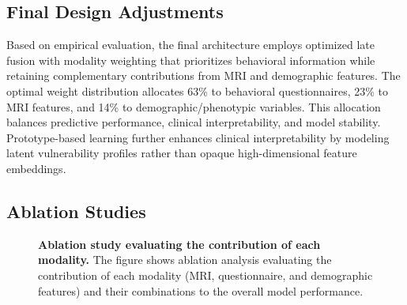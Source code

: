 \documentclass[10pt,letterpaper]{article}
\begin{document}
                                                                                                                          \subsection*{Final Design Adjustments}

                                                                                                                          Based on empirical evaluation, the final architecture employs optimized late fusion with modality weighting that prioritizes behavioral information while retaining complementary contributions from MRI and demographic features. The optimal weight distribution allocates 63\% to behavioral questionnaires, 23\% to MRI features, and 14\% to demographic/phenotypic variables. This allocation balances predictive performance, clinical interpretability, and model stability. Prototype-based learning further enhances clinical interpretability by modeling latent vulnerability profiles rather than opaque high-dimensional feature embeddings.

                                                                                                                          \subsection*{Ablation Studies}

                                                                                                                          \begin{figure}[!h]
                                                                                                                          \caption{\textbf{Ablation study evaluating the contribution of each modality.}
                                                                                                                          The figure shows ablation analysis evaluating the contribution of each modality (MRI, questionnaire, and demographic features) and their combinations to the overall model performance.}
                                                                                                                          \label{fig:ablation_analysis}
                                                                                                                          \end{figure}
\end{document}
